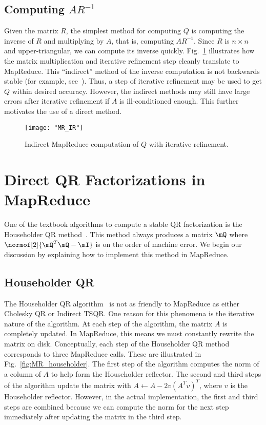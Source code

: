 \documentclass[10pt, conference, compsocconf]{IEEEtran}
\begin{document}
\subsection{Computing $AR^{-1}$}
Given the matrix $R$, the simplest method for computing $Q$ is computing the inverse of $R$ and multiplying by $A$, that is, computing $AR^{-1}$.  Since $R$ is $n \times n$ and upper-triangular, we can compute its inverse quickly. Fig.~\ref{fig:MR_IR} illustrates how the matrix multiplication and iterative refinement step cleanly translate to MapReduce.  This ``indirect'' method of the inverse computation is not backwards stable (for example, see~\cite{Stathopoulos2001-QR}).  Thus, a step of iterative refinement may be used to get $Q$ within desired accuracy.  However, the indirect methods may still have large errors after iterative refinement if $A$ is ill-conditioned enough.  This further motivates the use of a direct method.

\begin{figure}[tbp]
\centering
\texttt{[image: "MR\_IR"]}
\caption{Indirect MapReduce computation of $Q$ with iterative refinement.}
\label{fig:MR_IR}
\end{figure}

\section{Direct QR Factorizations in MapReduce}\label{sec:direct_QR}

One of the textbook algorithms to compute a stable QR factorization
is the Householder QR method~\cite{golub1996-matrix}.  This method
always produces a matrix $\mQ$ where $\normof[2]{\mQ^T \mQ - \mI}$ is on 
the order of machine error.  We begin our discussion by explaining
how to implement this method in MapReduce.

\subsection{Householder QR}



The Householder QR algorithm~\cite{Trefethen1997-book} is not as friendly to MapReduce as either Cholesky QR or Indirect TSQR.  One reason for this phenomena is the iterative nature of the algorithm.  At each step of the algorithm, the matrix $A$ is completely updated.  In MapReduce, this means we must constantly rewrite the matrix on disk.  Conceptually, each step of the Householder QR method corresponds to three MapReduce calls.  These are illustrated in Fig.~\ref{fig:MR_householder}.  The first step of the algorithm computes the norm of a column of $A$ to help form the Householder reflector.  The second and third steps of the algorithm update the matrix with $A \leftarrow A - 2v(A^Tv)^T$, where $v$ is the Householder reflector.  However, in the actual implementation, the first and third steps are combined because we can compute the norm for the next step immediately after updating the matrix in the third step.  
\end{document}
